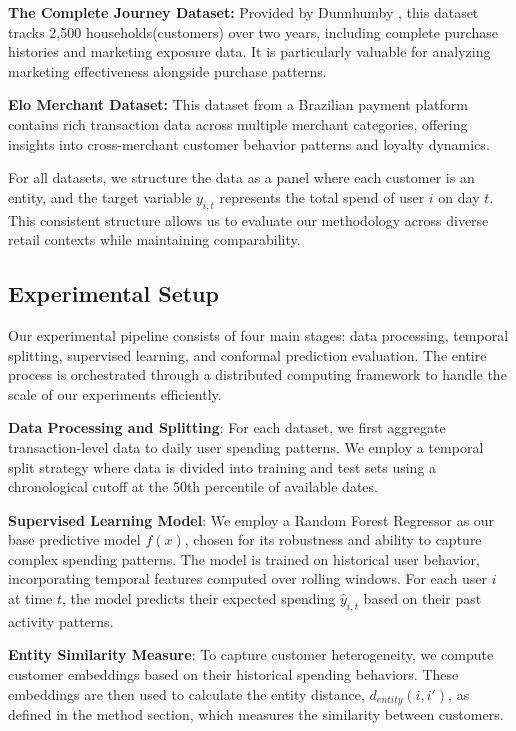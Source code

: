 \textbf{The Complete Journey Dataset:} Provided by Dunnhumby \cite{dunnhumby2014complete}, this dataset tracks 2,500 households(customers) over two years, including complete purchase histories and marketing exposure data. It is particularly valuable for analyzing marketing effectiveness alongside purchase patterns.

\textbf{Elo Merchant Dataset:} This dataset \cite{elo2019merchant} from a Brazilian payment platform contains rich transaction data across multiple merchant categories, offering insights into cross-merchant customer behavior patterns and loyalty dynamics.

For all datasets, we structure the data as a panel where each customer is an entity, and the target variable $y_{i,t}$ represents the total spend of user $i$ on day $t$. This consistent structure allows us to evaluate our methodology across diverse retail contexts while maintaining comparability.

\subsection{Experimental Setup}

Our experimental pipeline consists of four main stages: data processing, temporal splitting, supervised learning, and conformal prediction evaluation. The entire process is orchestrated through a distributed computing framework to handle the scale of our experiments efficiently.

\textbf{Data Processing and Splitting}: For each dataset, we first aggregate transaction-level data to daily user spending patterns. We employ a temporal split strategy where data is divided into training and test sets using a chronological cutoff at the 50th percentile of available dates.

\textbf{Supervised Learning Model}: We employ a Random Forest Regressor as our base predictive model $f(x)$, chosen for its robustness and ability to capture complex spending patterns. The model is trained on historical user behavior, incorporating temporal features computed over rolling windows. For each user $i$ at time $t$, the model predicts their expected spending $\hat{y}_{i,t}$ based on their past activity patterns.

\textbf{Entity Similarity Measure}: To capture customer heterogeneity, we compute customer embeddings based on their historical spending behaviors. These embeddings are then used to calculate the entity distance, $d_{entity}(i, i')$, as defined in the method section, which measures the similarity between customers.

